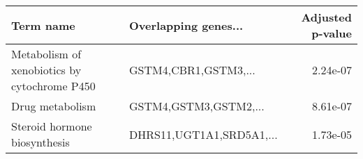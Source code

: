 \begin{tabular}{llr}
\toprule
                                   Term name &     Overlapping genes... &  Adjusted p-value \\
\midrule
Metabolism of xenobiotics by cytochrome P450 &     GSTM4,CBR1,GSTM3,... &          2.24e-07 \\
                             Drug metabolism &    GSTM4,GSTM3,GSTM2,... &          8.61e-07 \\
                Steroid hormone biosynthesis & DHRS11,UGT1A1,SRD5A1,... &          1.73e-05 \\
\bottomrule
\end{tabular}
